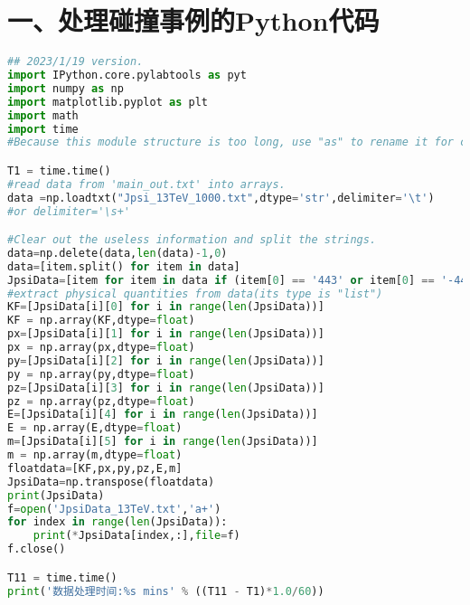 \begin{center}
\end{center}

\section*{一、处理碰撞事例的Python代码}
\begin{lstlisting}[language={python}, basicstyle = \ttfamily,breaklines = true, caption={Python 源代码}, label=code_1]
## 2023/1/19 version.
import IPython.core.pylabtools as pyt 
import numpy as np
import matplotlib.pyplot as plt
import math
import time
#Because this module structure is too long, use "as" to rename it for conveniently invoking.

T1 = time.time()
#read data from 'main_out.txt' into arrays.
data =np.loadtxt("Jpsi_13TeV_1000.txt",dtype='str',delimiter='\t')
#or delimiter='\s+'

#Clear out the useless information and split the strings.
data=np.delete(data,len(data)-1,0)
data=[item.split() for item in data]
JpsiData=[item for item in data if (item[0] == '443' or item[0] == '-443')]
#extract physical quantities from data(its type is "list")
KF=[JpsiData[i][0] for i in range(len(JpsiData))]
KF = np.array(KF,dtype=float)
px=[JpsiData[i][1] for i in range(len(JpsiData))]
px = np.array(px,dtype=float)
py=[JpsiData[i][2] for i in range(len(JpsiData))]
py = np.array(py,dtype=float)
pz=[JpsiData[i][3] for i in range(len(JpsiData))]
pz = np.array(pz,dtype=float)
E=[JpsiData[i][4] for i in range(len(JpsiData))]
E = np.array(E,dtype=float)
m=[JpsiData[i][5] for i in range(len(JpsiData))]
m = np.array(m,dtype=float)
floatdata=[KF,px,py,pz,E,m]
JpsiData=np.transpose(floatdata)
print(JpsiData)
f=open('JpsiData_13TeV.txt','a+')
for index in range(len(JpsiData)):
    print(*JpsiData[index,:],file=f)
f.close()

T11 = time.time()
print('数据处理时间:%s mins' % ((T11 - T1)*1.0/60))
\end{lstlisting}